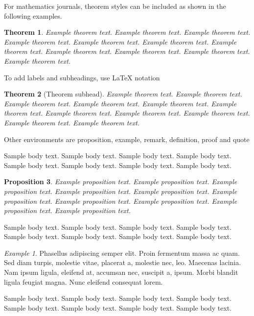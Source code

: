 \documentclass[sn-basic,pdflatex]{sn-jnl}
\newtheorem{theorem}{Theorem}%
\newtheorem{proposition}[theorem]{Proposition}%
\theoremstyle{remark}
\newtheorem{example}{Example}%
\theoremstyle{definition}
\begin{document}
For mathematics journals, theorem styles can be included as shown in the
following examples.

\begin{theorem}
Example theorem text. Example theorem text. Example theorem text.
Example theorem text. Example theorem text. Example theorem text.
Example theorem text. Example theorem text. Example theorem text.
Example theorem text. Example theorem text.

\end{theorem}

To add labels and subheadings, use LaTeX notation

\begin{theorem}[Theorem subhead]\label{thm1}
Example theorem text. Example theorem text. Example theorem text.
Example theorem text. Example theorem text. Example theorem text.
Example theorem text. Example theorem text. Example theorem text.
Example theorem text. Example theorem text.

\end{theorem}

Other environments are proposition, example, remark, definition, proof
and quote

Sample body text. Sample body text. Sample body text. Sample body text.
Sample body text. Sample body text. Sample body text. Sample body text.

\begin{proposition}
Example proposition text. Example proposition text. Example proposition
text. Example proposition text. Example proposition text. Example
proposition text. Example proposition text. Example proposition text.
Example proposition text. Example proposition text.

\end{proposition}

Sample body text. Sample body text. Sample body text. Sample body text.
Sample body text. Sample body text. Sample body text. Sample body text.

\begin{example}
Phasellus adipiscing semper elit. Proin fermentum massa ac quam. Sed
diam turpis, molestie vitae, placerat a, molestie nec, leo. Maecenas
lacinia. Nam ipsum ligula, eleifend at, accumsan nec, suscipit a, ipsum.
Morbi blandit ligula feugiat magna. Nunc eleifend consequat lorem.

\end{example}

Sample body text. Sample body text. Sample body text. Sample body text.
Sample body text. Sample body text. Sample body text. Sample body text.
\end{document}
